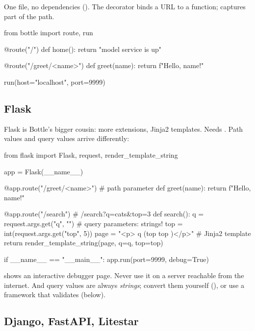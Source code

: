 One file, no dependencies (). The decorator binds a URL to a function;
 captures part of the path.

\begin{pycode}
from bottle import route, run

@route("/")
def home():
    return "model service is up"

@route("/greet/<name>")
def greet(name):
    return f"Hello, {name}!"

run(host="localhost", port=9999)
\end{pycode}

\subsection{Flask}

Flask is Bottle's bigger cousin: more extensions, Jinja2 templates. Needs .
Path values and query values arrive differently:

\begin{pycode}
from flask import Flask, request, render_template_string

app = Flask(__name__)

@app.route("/greet/<name>")            # path parameter
def greet(name):
    return f"Hello, {name}!"

@app.route("/search")                  # /search?q=cats&top=3
def search():
    q = request.args.get("q", "")      # query parameters: strings!
    top = int(request.args.get("top", 5))
    page = "<p>{{ q }} (top {{ top }})</p>"      # Jinja2 template
    return render_template_string(page, q=q, top=top)

if __name__ == "__main__":
    app.run(port=9999, debug=True)
\end{pycode}

\begin{trap}
 shows an interactive debugger page. Never use it on a server reachable from the
internet. And query values are always \emph{strings}; convert them yourself (), or
use a framework that validates (below).
\end{trap}

\subsection{Django, FastAPI, Litestar}

